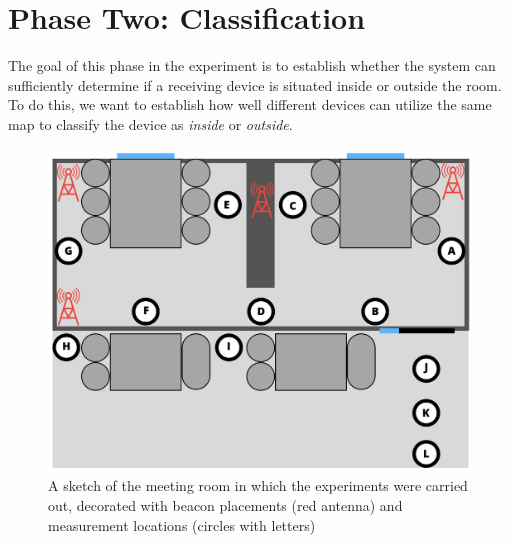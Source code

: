 \section{Phase Two: Classification}\label{sec:eval_phase2} %
The goal of this phase in the experiment is to establish whether the system can sufficiently determine if a receiving device is situated inside or outside the room.
To do this, we want to establish how well different devices can utilize the same map to classify the device as \textit{inside} or \textit{outside}. 
\begin{figure}[h]
    \centering
    \includegraphics[scale=0.5]{images/experiment_setup.png}
    \caption{A sketch of the meeting room in which the experiments were carried out, decorated with beacon placements (red antenna) and measurement locations (circles with letters)}
    \label{fig:experiment_setup}
\end{figure}

